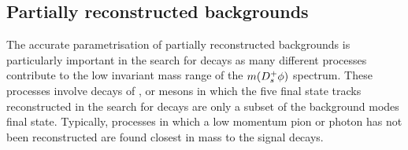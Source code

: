 

\subsection{Partially reconstructed backgrounds}
\label{sec:B2DsPhi_partrecocomps}

The accurate parametrisation of partially reconstructed backgrounds is particularly important in the search for \decay{\Bp}{\Dsp\phiz} decays as many different processes contribute to the low invariant mass range of the $m({{D}^+_{s}}\phi)$ spectrum. These processes involve decays of \Bs, \Bz or \Bp mesons in which the five final state tracks reconstructed in the search for \decay{\Bp}{\Dsp\phiz} decays are only a subset of the background modes final state. 
Typically, processes in which a low momentum pion or photon has not been reconstructed are found closest in mass to the signal decays. 

